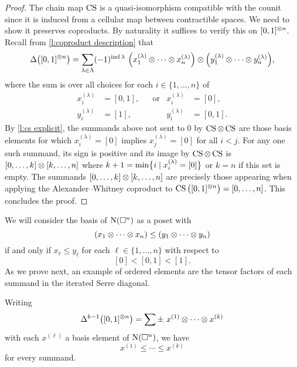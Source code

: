 \begin{proof}
	The chain map $\CS$ is a quasi-isomorphism compatible with the counit since it is induced from a cellular map between contractible spaces.
	We need to show it preserves coproducts.
	By naturality it suffices to verify this on $[0,1]^{\ot n}$.
	Recall from \cref{l:coproduct description} that
	\[
	\Delta \big( [0,1]^{\ot n} \big) =
	\sum_{\lambda \in \Lambda} (-1)^{\ind \lambda} \
	\Big(x_1^{(\lambda)} \ot \cdots \ot x_n^{(\lambda)}\Big) \ot
	\Big(y_1^{(\lambda)} \ot \cdots \ot y_n^{(\lambda)}\Big),
	\]
	where the sum is over all choices for each $i \in \{1,\dots,n\}$ of
	\begin{align*}
		x_i^{(\lambda)} &= [0,1],&&\text{or} & x_i^{(\lambda)} &= [0], \\
		y_i^{(\lambda)} &= [1],  && & y_i^{(\lambda)} &= [0,1].
	\end{align*}
	By \cref{l:cs explicit}, the summands above not sent to $0$ by $\CS \ot \CS$ are those basis elements for which $x_i^{(\lambda)} = [0]$ implies $x_j^{(\lambda)} = [0]$ for all $i < j$.
	For any one such summand, its sign is positive and its image by $\CS \ot \CS$ is $[0, \dots, k] \ot [k, \dots, n]$ where $k+1 = \min\set[\big]{i \mid x_i^{(\lambda)} = [0]}$ or $k = n$ if this set is empty.
	The summands $[0, \dots, k] \ot [k,\dots,n]$ are precisely those appearing when applying the Alexander--Whitney coproduct to $\CS \big([0,1]^{\ot n}\big) = [0,\dots,n]$.
	This concludes the proof.
\end{proof}

We will consider the basis of $\chains(\cube^n)$ as a poset with
\[
(x_1 \ot \cdots \ot x_n) \leq (y_1 \ot \cdots \ot y_n)
\]
if and only if $x_\ell \leq y_\ell$ for each $\ell \in \{1, \dots, n\}$ with respect to
\[
[0] < [0,1] < [1].
\]
As we prove next, an example of ordered elements are the tensor factors of each summand in the iterated Serre diagonal.

\begin{lemma} \label{l:order iterated coproduct}
	Writing
	\[
	\Delta^{k-1} \big([0,1]^{\ot n}\big) =
	\sum \pm \ x^{(1)} \ot \cdots \ot x^{(k)}
	\]
	with each $x^{(\ell)}$ a basis element of $\chains(\cube^n)$, we have
	\[
	x^{(1)} \leq \cdots \leq x^{(k)}
	\]
	for every summand.
\end{lemma}

